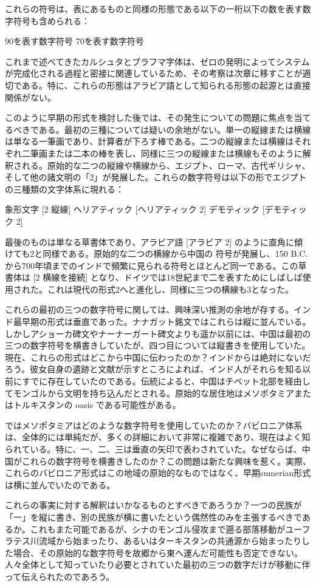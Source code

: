 \documentclass[a4paper,11pt,openany]{ltjsbook}
\begin{document}
これらの符号は、表にあるものと同様の形態である以下の一桁以下の数を表す数字符号も含められる：

90を表す数字符号
70を表す数字符号

これまで述べてきたカルシュタとブラフマ字体は、ゼロの発明によってシステムが完成化される過程と密接に関連しているため、その考察は次章に移すことが適切である。特に、これらの形態はアラビア語として知られる形態の起源とは直接関係がない。

このように早期の形式を検討した後では、その発生についての問題に焦点を当てるべきである。最初の三種については疑いの余地がない。単一の縦線または横線は単なる一筆画であり、計算者が下ろす棒である。二つの縦線または横線はそれぞれ二筆画または二本の棒を表し、同様に三つの縦線または横線もそのように解釈される。原始的な二つの縦線や横線から、エジプト、ローマ、古代ギリシャ、そして他の諸文明の「2」が発展した。これらの数字符号は以下の形でエジプトの三種類の文字体系に現れる：

象形文字 [2 縦線]
ヘリアティック     [ヘリアティック 2]
デモティック      [デモティック 2]

最後のものは単なる草書体であり、アラビア語 [アラビア 2] のように直角に傾けても2と同様である。原始的な二つの横線から中国の  符号が発展し、150 B.C.から700年頃までのインドで頻繁に見られる符号とほとんど同一である。この草書体は [2 横線を接続] となり、ドイツでは18世紀まで二を表すためにしばしば使用された。これは現代の形式2へと進化し、同様に三つの横線も3となった。

これらの最初の三つの数字符号に関しては、興味深い推測の余地が存する。インド最早期の形式は垂直であった。ナナガット銘文ではこれらは縦に並んでいる。しかしアショーカ碑文やナーナーガート碑文よりも遥か以前には、中国は最初の三つの数字符号を横書きしていたが、四つ目については縦書きを使用していた。現在、これらの形式はどこから中国に伝わったのか？インドからは絶対にないだろう。彼女自身の遺跡と文献が示すところによれば、インド人がそれらを知る以前にすでに存在していたのである。伝統によると、中国はチベット北部を経由してモンゴルから文明を持ち込んだとされる。原始的な居住地はメソポタミアまたはトルキスタンの oasis である可能性がある。

ではメソポタミアはどのような数字符号を使用していたのか？バビロニア体系は、全体的には単純だが、多くの詳細において非常に複雑であり、現在はよく知られている。特に、一、二、三は垂直の矢印で表わされていた。なぜならば、中国がこれらの数字符号を横書きしたのか？この問題は新たな興味を惹く。実際、これらのバビロニア形式はこの地域の原始的なものではなく、早期sumerian形式は横に並んでいたのである。

これらの事実に対する解釈はいかなるものとすべきであろうか？一つの民族が「一」を縦に書き、別の民族が横に書いたという偶然性のみを主張するべきであるか。これもまた可能であるが、シナのモンゴル侵攻まで遡る部落移動がユーフラテス川流域から始まったり、あるいはターキスタンの共通源から始まったりした場合、その原始的な数字符号を故郷から東へ運んだ可能性も否定できない。人々全体として知っていたり必要とされていた最初の三つの数字だけが移動に伴って伝えられたのであろう。
\end{document}
